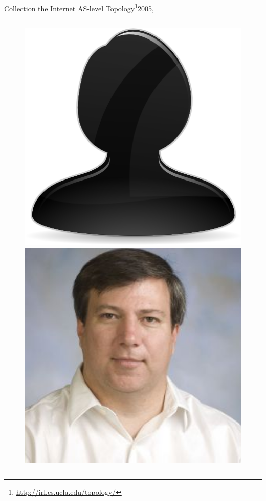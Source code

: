 \documentclass[ngerman,compress,hyperref={bookmarks}]{beamer}
\begin{document}
\begin{frame}{Collection the Internet AS-level Topology\footnote{\url{http://irl.cs.ucla.edu/topology/}}}{2005, \cite{Zhang:2005:CIA:1052812.1052825}}
\begin{columns}[c]
\begin{column}{0.08\textwidth}
\begin{figure}
        \includegraphics[width=1\textwidth]{images/person}\\
        \includegraphics[width=1\textwidth]{images/massey}\\

\end{figure}
\end{column}
\end{columns}
\end{frame}
\end{document}

